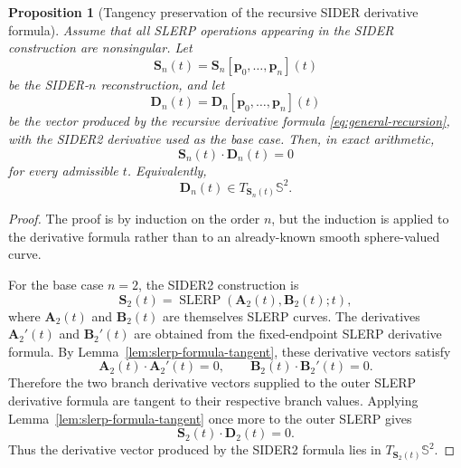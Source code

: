 \documentclass[a4paper,11pt]{article}
\newcommand{\bp}{\mathbf{p}}
\newcommand{\bD}{\mathbf{D}}
\numberwithin{equation}{section}
\theoremstyle{plain}
\newtheorem{prop}[thm]{Proposition}
\theoremstyle{definition}
\theoremstyle{remark}
\newcommand{\slerp}{\operatorname{SLERP}}
\begin{document}
\begin{prop}[Tangency preservation of the recursive SIDER derivative formula]\label{prop:sider-formula-tangent}
Assume that all SLERP operations appearing in the SIDER construction are nonsingular.  Let
\[
        \mathbf{S}_n(t)=\mathbf{S}_n[\bp_0,\ldots,\bp_n](t)
\]
be the SIDER-\(n\) reconstruction, and let
\[
        \bD_n(t)=\bD_n[\bp_0,\ldots,\bp_n](t)
\]
be the vector produced by the recursive derivative formula \eqref{eq:general-recursion}, with the SIDER2 derivative used as the base case.  Then, in exact arithmetic,
\[
        \mathbf{S}_n(t)\cdot\bD_n(t)=0
\]
for every admissible \(t\).  Equivalently,
\[
        \bD_n(t)\in T_{\mathbf{S}_n(t)}\mathbb{S}^2 .
\]
\end{prop}

\begin{proof}
The proof is by induction on the order \(n\), but the induction is applied to the derivative formula rather than to an already-known smooth sphere-valued curve.

For the base case \(n=2\), the SIDER2 construction is
\[
        \mathbf{S}_2(t)=\slerp(\mathbf{A}_2(t),\mathbf{B}_2(t);t),
\]
where \(\mathbf{A}_2(t)\) and \(\mathbf{B}_2(t)\) are themselves SLERP curves.  The derivatives \(\mathbf{A}_2'(t)\) and \(\mathbf{B}_2'(t)\) are obtained from the fixed-endpoint SLERP derivative formula.  By Lemma~\ref{lem:slerp-formula-tangent}, these derivative vectors satisfy
\[
        \mathbf{A}_2(t)\cdot\mathbf{A}_2'(t)=0,
        \qquad
        \mathbf{B}_2(t)\cdot\mathbf{B}_2'(t)=0 .
\]
Therefore the two branch derivative vectors supplied to the outer SLERP derivative formula are tangent to their respective branch values.  Applying Lemma~\ref{lem:slerp-formula-tangent} once more to the outer SLERP gives
\[
        \mathbf{S}_2(t)\cdot\bD_2(t)=0 .
\]
Thus the derivative vector produced by the SIDER2 formula lies in \(T_{\mathbf{S}_2(t)}\mathbb{S}^2\).


\end{proof}
\end{document}
